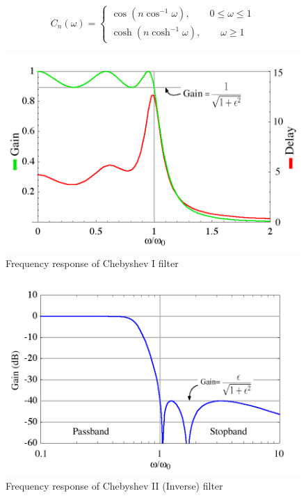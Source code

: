 \documentclass[a4paper,11pt]{article}
\begin{document}
\begin{equation*}
    C_n(\omega)= \begin{cases}
        \cos(n\cos^{-1}\omega),\quad\quad 0\leq\omega\leq 1 \\
        \cosh(n\cosh^{-1}\omega),\quad\quad \omega\geq 1
    \end{cases}
\end{equation*}

\begin{figure}[H]
    \centering
    \includegraphics[width=\linewidth]{./FIG/chebyshev I.png}
    \caption{Frequency response of Chebyshev I filter}
\end{figure}

\begin{figure}[H]
    \centering
    \includegraphics[width=\linewidth]{./FIG/chebyshev II.png}
    \caption{Frequency response of Chebyshev II (Inverse) filter}
\end{figure}
\end{document}
